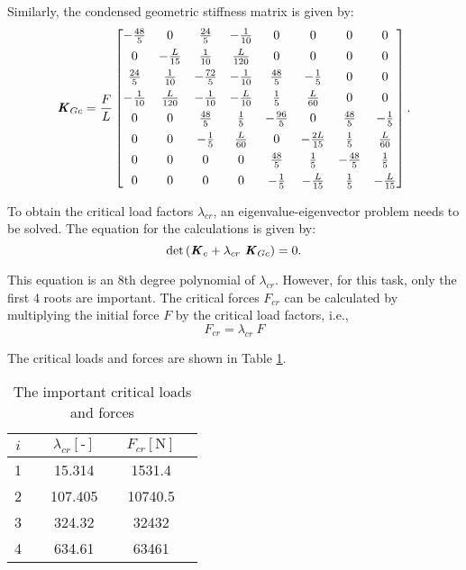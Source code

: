 \documentclass[12pt]{article}
\begin{document}
Similarly, the condensed geometric stiffness matrix is given by:
\begin{equation}
\textbf{\textit{K}}_{Gc} = \frac{F}{L}
\left[\begin{matrix}
-\frac{48}{5} & 0 & \frac{24}{5} & -\frac{1}{10} & 0 & 0 & 0 & 0 \\[1ex]
0 & -\frac{L}{15} & \frac{1}{10} & \frac{L}{120} & 0 & 0 & 0 & 0 \\[1ex]
\frac{24}{5} & \frac{1}{10} & -\frac{72}{5} & -\frac{1}{10} & \frac{48}{5} & -\frac{1}{5} & 0 & 0 \\[1ex]
-\frac{1}{10} & \frac{L}{120} & -\frac{1}{10} & -\frac{L}{10} & \frac{1}{5} & \frac{L}{60} & 0 & 0 \\[1ex]
0 & 0 & \frac{48}{5} & \frac{1}{5} & -\frac{96}{5} & 0 & \frac{48}{5} & -\frac{1}{5} \\[1ex]
0 & 0 & -\frac{1}{5} & \frac{L}{60} & 0 & -\frac{2L}{15} & \frac{1}{5} & \frac{L}{60} \\[1ex]
0 & 0 & 0 & 0 & \frac{48}{5} & \frac{1}{5} & -\frac{48}{5} & \frac{1}{5} \\[1ex]
0 & 0 & 0 & 0 & -\frac{1}{5} & - \frac{L}{15} & \frac{1}{5} & -\frac{L}{15}
\end{matrix} \right].
\end{equation}

To obtain the critical load factors $\lambda_{cr}$, an eigenvalue-eigenvector problem needs to be solved. The equation for the calculations is given by:
\begin{equation}
\det \left(\textbf{\textit{K}}_c + \lambda_{cr} ~ \textbf{\textit{K}}_{Gc} \right) = 0.
\end{equation}

This equation is an 8th degree polynomial of $\lambda_{cr}$. However, for this task, only the first 4 roots are important. The critical forces $F_{cr}$ can be calculated by multiplying the initial force $F$ by the critical load factors, i.e.,
\begin{equation}
F_{cr} = \lambda_{cr} ~ F
\end{equation}

The critical loads and forces are shown in Table \ref{tab:critical-loads-forces1}.
\begin{table}[h]
\centering
\captionsetup{justification=centering,position=top} %
\caption{The important critical loads and forces} %
\label{tab:critical-loads-forces1}
\begin{tabular}{cccccc}

$i$ && $\lambda_{cr} \left[ \text{-} \right]$ && $F_{cr} \left[ \text{N} \right]$ \\
\hline
1 && 15.314 &&  1531.4 \\
2 &&  107.405 &&  10740.5 \\
3 &&  324.32 &&  32432 \\
4 &&  634.61 &&  63461 \\

\end{tabular}

\end{table}
\end{document}
